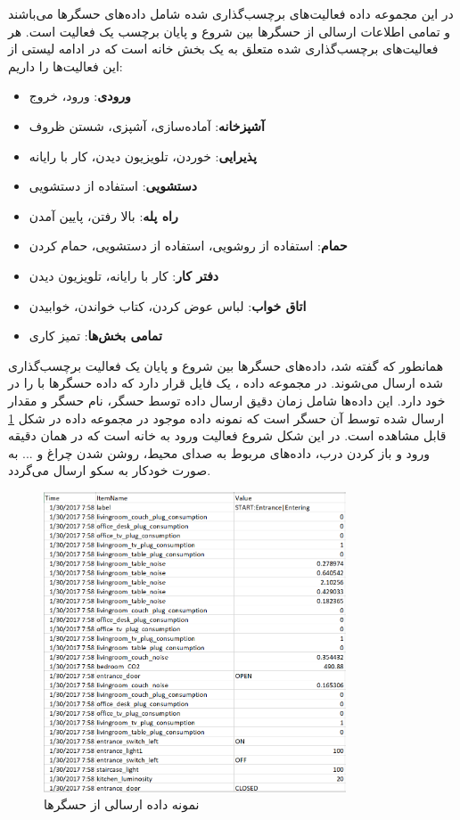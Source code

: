 در این مجموعه داده فعالیت‌های برچسب‌گذاری شده شامل داده‌های حسگرها می‌باشند و تمامی اطلاعات ارسالی از حسگرها بین شروع و پایان برچسب یک فعالیت است. هر فعالیت‌های برچسب‌گذاری شده متعلق به یک بخش خانه است که در ادامه لیستی از این فعالیت‌ها را داریم:

\begin{itemize}
\item \textbf{ورودی}: ورود، خروج
\item \textbf{آشپزخانه}: آماده‌سازی، آشپزی، شستن ظروف
\item \textbf{پذیرایی}: خوردن، تلویزیون دیدن، کار با رایانه
\item \textbf{دستشویی}: استفاده از دستشویی
\item \textbf{راه پله}: بالا رفتن، پایین آمدن
\item \textbf{حمام}: استفاده از روشویی، استفاده از دستشویی، حمام کردن
\item \textbf{دفتر کار}: کار با رایانه، تلویزیون دیدن
\item \textbf{اتاق خواب}: لباس عوض کردن، کتاب خواندن، خوابیدن
\item \textbf{تمامی بخش‌ها}: تمیز کاری
\end{itemize}

همانطور که گفته شد، داده‌های حسگرها بین شروع و پایان یک فعالیت برچسب‌گذاری شده ارسال می‌شوند. در مجموعه داده ، یک فایل  قرار دارد که داده حسگرها با را در خود دارد. این داده‌ها شامل زمان دقیق ارسال داده توسط حسگر، نام حسگر و مقدار ارسال شده توسط آن حسگر است که نمونه داده‌ موجود در مجموعه داده در شکل \ref{fig:fO4H3} قابل مشاهده است. در این شکل شروع فعالیت ورود به خانه است که در همان دقیقه ورود و باز کردن درب، داده‌های مربوط به صدای محیط، روشن شدن چراغ و ... به صورت خودکار به سکو ارسال می‌گردد.

\begin{figure}[H]
\centerline{\includegraphics[width=0.8\textwidth]{figs/fO4H3.png}}
\caption{نمونه داده ارسالی از حسگرها}
\label{fig:fO4H3}
\end{figure}


